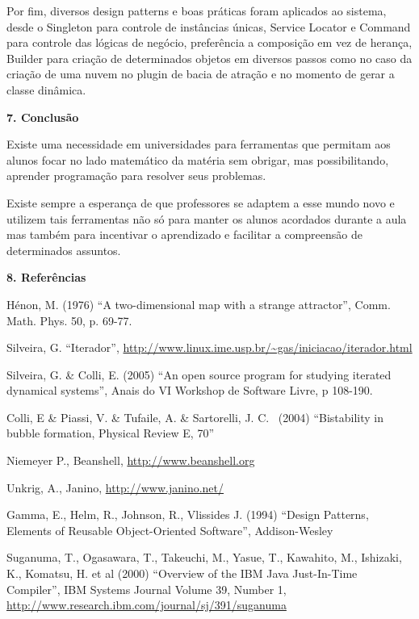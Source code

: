\documentclass[a4paper,12pt]{article}
\begin{document}
{
 Por fim, diversos design patterns e boas pr\'aticas foram aplicados ao
sistema, desde o Singleton para controle de inst\^ancias \'unicas,
Service Locator e Command para controle das l\'ogicas de neg\'ocio,
prefer\^encia a composi\c{c}\~ao em vez de heran\c{c}a, Builder para
cria\c{c}\~ao de determinados objetos em diversos passos como no caso
da cria\c{c}\~ao de uma nuvem no plugin de bacia de atra\c{c}\~ao e no
momento de gerar a classe din\^amica.}

{\bfseries
7. Conclus\~ao}

{
Existe uma necessidade em universidades para ferramentas que permitam
aos alunos focar no lado matem\'atico da mat\'eria sem obrigar, mas
possibilitando, aprender programa\c{c}\~ao para resolver seus
problemas. }

{
 Existe sempre a esperan\c{c}a de que professores se adaptem a esse
mundo novo e utilizem tais ferramentas n\~ao s\'o para manter os alunos
acordados durante a aula mas tamb\'em para incentivar o aprendizado e
facilitar a compreens\~ao de determinados assuntos.}

{\bfseries
8. Refer\^encias}

{
H\'enon, M. (1976) ``A two{}-dimensional map with a strange attractor'',
Comm. Math. Phys. 50, p. 69{}-77.}

{
Silveira, G. ``Iterador'',
\href{http://www.linux.ime.usp.br/~gas/iniciacao/iterador.html}{http://www.linux.ime.usp.br/\~{}gas/iniciacao/iterador.html}}

{
Silveira, G. \& Colli, E. (2005) ``An open source program for studying
iterated dynamical systems'', Anais do VI Workshop de Software Livre, p
108{}-190.}

{
Colli, E \& Piassi, V. \& Tufaile, A. \& Sartorelli, J. C. \ (2004)
``Bistability in bubble formation, Physical Review E, 70''}

{
Niemeyer P., Beanshell,
\href{http://www.beanshell.org/}{http://www.beanshell.org}}

{
Unkrig, A., Janino,
\href{http://www.janino.net/}{http://www.janino.net/}}

{
Gamma, E., Helm, R., Johnson, R., Vlissides J. (1994) ``Design Patterns,
Elements of Reusable Object{}-Oriented Software'', Addison{}-Wesley}

{
Suganuma, T., Ogasawara, T., Takeuchi, M., Yasue, T., Kawahito, M.,
Ishizaki, K., Komatsu, H. et al (2000) ``Overview of the IBM Java
Just{}-In{}-Time Compiler'', IBM Systems Journal Volume 39, Number 1,
\href{http://www.research.ibm.com/journal/sj/391/suganuma}{http://www.research.ibm.com/journal/sj/391/suganuma}}
\end{document}
